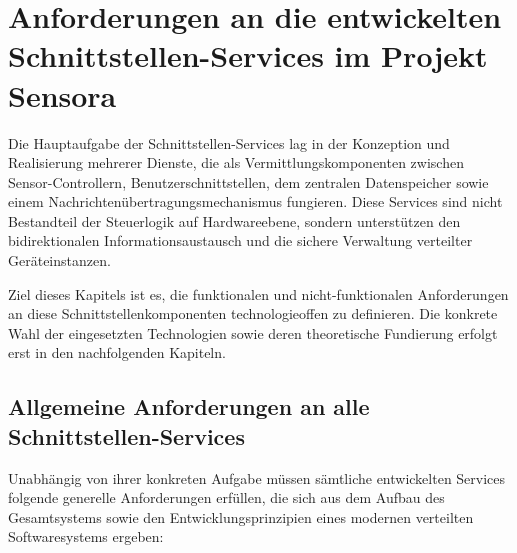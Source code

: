 \section{Anforderungen an die entwickelten Schnittstellen-Services im Projekt Sensora}

Die Hauptaufgabe der Schnittstellen-Services lag in der Konzeption und Realisierung mehrerer Dienste, die als Vermittlungskomponenten zwischen Sensor-Controllern, Benutzerschnittstellen, dem zentralen Datenspeicher sowie einem Nachrichtenübertragungsmechanismus fungieren. Diese Services sind nicht Bestandteil der Steuerlogik auf Hardwareebene, sondern unterstützen den bidirektionalen Informationsaustausch und die sichere Verwaltung verteilter Geräteinstanzen.

Ziel dieses Kapitels ist es, die funktionalen und nicht-funktionalen Anforderungen an diese Schnittstellenkomponenten technologieoffen zu definieren. Die konkrete Wahl der eingesetzten Technologien sowie deren theoretische Fundierung erfolgt erst in den nachfolgenden Kapiteln.

\subsection{Allgemeine Anforderungen an alle Schnittstellen-Services}

Unabhängig von ihrer konkreten Aufgabe müssen sämtliche entwickelten Services folgende generelle Anforderungen erfüllen, die sich aus dem Aufbau des Gesamtsystems sowie den Entwicklungsprinzipien eines modernen verteilten Softwaresystems ergeben:

